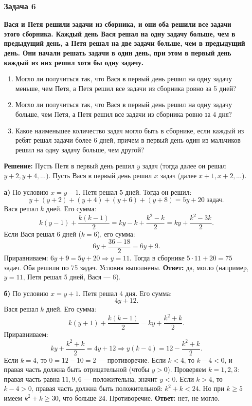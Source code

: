\documentclass[12pt, a4paper]{article}
\begin{document}
\subsubsection*{Задача 6}
\textbf{Вася и Петя решили задачи из сборника, и они оба решили все задачи этого сборника. Каждый день Вася решал на одну задачу больше, чем в предыдущий день, а Петя решал на две задачи больше, чем в предыдущий день. Они начали решать задачи в один день, при этом в первый день каждый из них решил хотя бы одну задачу.}
\begin{enumerate}[label=\alph*)]
    \item Могло ли получиться так, что Вася в первый день решил на одну задачу меньше, чем Петя, а Петя решил все задачи из сборника ровно за 5 дней?
    \item Могло ли получиться так, что Вася в первый день решил на одну задачу больше, чем Петя, а Петя решил все задачи из сборника ровно за 4 дня?
    \item Какое наименьшее количество задач могло быть в сборнике, если каждый из ребят решал задачи более 6 дней, причем в первый день один из мальчиков решил на одну задачу больше, чем другой?
\end{enumerate}

\textbf{Решение:}
Пусть Петя в первый день решил $y$ задач (тогда далее он решал $y+2, y+4, \dots$).
Пусть Вася в первый день решил $x$ задач (далее $x+1, x+2, \dots$).

\textbf{а)} По условию $x = y - 1$. Петя решал 5 дней. Тогда он решил:
\[
y + (y+2) + (y+4) + (y+6) + (y+8) = 5y + 20 \text{ задач.}
\]
Вася решал $k$ дней. Его сумма:
\[
k(y-1) + \frac{k(k-1)}{2} = ky - k + \frac{k^2 - k}{2} = ky + \frac{k^2 - 3k}{2}.
\]
Если Вася решал 6 дней ($k=6$), его сумма:
\[
6y + \frac{36 - 18}{2} = 6y + 9.
\]
Приравниваем: $6y + 9 = 5y + 20 \Rightarrow y = 11$.
Тогда в сборнике $5 \cdot 11 + 20 = 75$ задач. Оба решили по 75 задач. Условия выполнены.
\textbf{Ответ:} да, могло (например, $y=11$, Петя решал 5 дней, Вася — 6).

\textbf{б)} По условию $x = y + 1$. Петя решал 4 дня. Его сумма:
\[
4y + 12.
\]
Вася решал $k$ дней. Его сумма:
\[
k(y+1) + \frac{k(k-1)}{2} = ky + \frac{k^2 + k}{2}.
\]
Приравниваем:
\[
ky + \frac{k^2 + k}{2} = 4y + 12 \Rightarrow y(k-4) = 12 - \frac{k^2 + k}{2}.
\]
Если $k = 4$, то $0 = 12 - 10 = 2$ — противоречие.
Если $k < 4$, то $k-4 < 0$, и правая часть должна быть отрицательной (чтобы $y > 0$). Проверяем $k=1,2,3$: правая часть равна $11, 9, 6$ — положительна, значит $y < 0$.
Если $k > 4$, то $k-4 > 0$, правая часть должна быть положительной: $k^2 + k < 24$. Но при $k \ge 5$ имеем $k^2 + k \ge 30$, что больше 24. Противоречие.
\textbf{Ответ:} нет, не могло.
\end{document}
